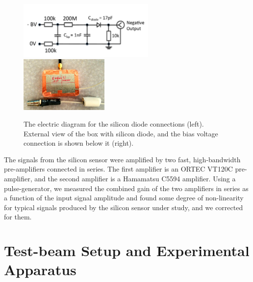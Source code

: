 \begin{figure}[htbp] 
\centering
\includegraphics[width=0.60\textwidth]{plots/SiliconDiodeDiagram.pdf} 
\includegraphics[width=0.39\textwidth]{plots/SiliconDiodeBox.jpg} 
\caption{The electric diagram for the silicon diode connections (left). External
view of the box with silicon diode, and the bias voltage connection is shown
below it (right).} 
\label{fig:SiliconPad} 
\end{figure} 

The signals from the silicon sensor were amplified by two fast, high-bandwidth
pre-amplifiers connected in series. The first amplifier is an ORTEC VT120C
pre-amplifier, and the second amplifier is a Hamamatsu C5594 amplifier. Using a
pulse-generator, we measured the combined gain of the two amplifiers in series
as a function of the input signal amplitude and found some degree of
non-linearity for typical signals produced by the silicon sensor under study,
and we corrected for them.


\section{Test-beam Setup and Experimental Apparatus }
\label{sec:tbeam}


